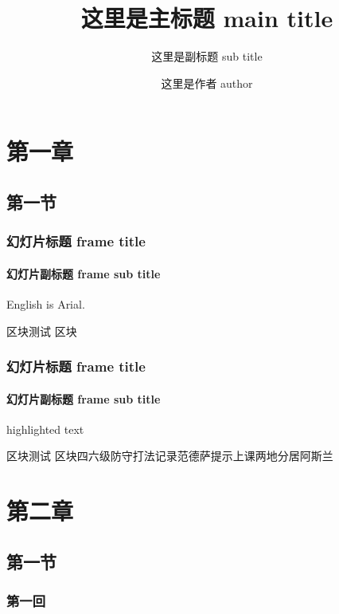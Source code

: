 \documentclass[12pt]{beamer}
\title{这里是主标题 main title}
\subtitle{这里是副标题 sub title}
\author{这里是作者 author}
\institute{这里是学院 institute}
\begin{document}
\maketitle


\section{第一章}

\subsection{第一节}


\begin{frame}[t]
    \frametitle{幻灯片标题 frame title}
    \framesubtitle{幻灯片副标题 frame sub title}

    English is Arial.

    \begin{block}{区块测试}
        区块
    \end{block}

\end{frame}

\begin{frame}[t]
    \frametitle{幻灯片标题 frame title}
    \framesubtitle{幻灯片副标题 frame sub title}

    \alert{highlighted text}

    \begin{block}{区块测试}
        区块四六级防守打法记录范德萨\alert{提示}上课两地分居阿斯兰
    \end{block}

\end{frame}

\section{第二章}
\subsection{第一节}
\subsubsection{第一回}
\end{document}
